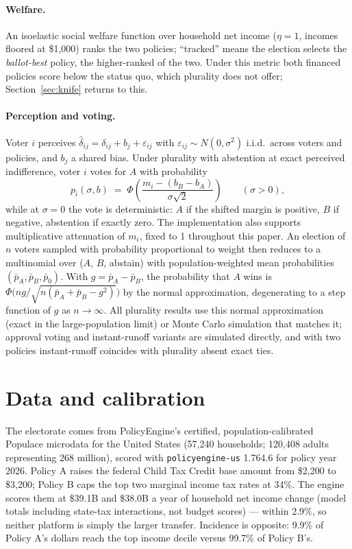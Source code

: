 \documentclass[11pt]{article}
\newcommand{\pkg}[1]{\texttt{#1}}
\begin{document}
\paragraph{Welfare.} An isoelastic social welfare function over household
net income (\(\eta = 1\), incomes floored at \$1{,}000) ranks the two
policies; ``tracked'' means the election selects the \emph{ballot-best}
policy, the higher-ranked of the two. Under this metric both financed
policies score below the status quo, which plurality does not offer; Section~\ref{sec:knife} returns to this.

\paragraph{Perception and voting.} Voter \(i\) perceives
\(\hat\delta_{ij} = \delta_{ij} + b_j + \varepsilon_{ij}\) with
\(\varepsilon_{ij} \sim N(0, \sigma^2)\) i.i.d.\ across voters and
policies, and \(b_j\) a shared bias. Under plurality with
abstention at exact perceived indifference, voter \(i\) votes for \(A\)
with probability
\begin{equation}
p_i(\sigma, b) \;=\; \Phi\!\left(\frac{m_i - (b_B - b_A)}{\sigma\sqrt{2}}\right)
\qquad (\sigma > 0),
\label{eq:probit}
\end{equation}
while at \(\sigma = 0\) the vote is deterministic: \(A\) if the shifted
margin is positive, \(B\) if negative, abstention if exactly zero.
The implementation also supports multiplicative attenuation of
\(m_i\), fixed to 1 throughout this paper. An election of \(n\) voters
sampled with probability proportional to weight then reduces to a
multinomial over (\(A\), \(B\), abstain) with
population-weighted mean probabilities \((\bar p_A, \bar p_B, \bar p_0)\).
With \(g = \bar p_A - \bar p_B\), the probability that \(A\) wins is
\(\Phi\!\big(ng / \sqrt{n(\bar p_A + \bar p_B - g^2)}\big)\) by the normal
approximation, degenerating to a step function of \(g\) as
\(n \to \infty\). All plurality results use this normal approximation (exact in the
large-population limit) or Monte Carlo simulation that matches it;
approval voting and instant-runoff variants are simulated directly, and
with two policies instant-runoff coincides with plurality absent exact
ties.

\section{Data and calibration}\label{sec:data}

The electorate comes from PolicyEngine's certified, population-calibrated
Populace microdata for the United States (57{,}240 households; 120{,}408
adults representing 268 million), scored with \pkg{policyengine-us} 1.764.6
for policy year 2026. Policy A raises the federal Child Tax Credit base
amount from \$2{,}200 to \$3{,}200; Policy B caps the top two marginal
income tax rates at 34\%. The engine scores them at \$39.1B and \$38.0B a
year of household net income change (model totals including state-tax
interactions, not budget scores) --- within 2.9\%, so neither platform is
simply the larger transfer. Incidence is opposite: 9.9\% of Policy A's
dollars reach the top income decile versus 99.7\% of Policy B's.
\end{document}
